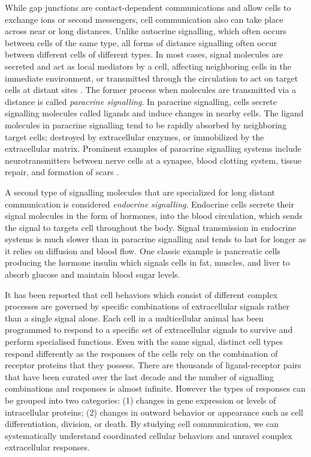 While gap junctions are contact-dependent communications and allow cells to exchange ions or second messengers, cell communication also can take place across near or long distances. Unlike autocrine signalling, which often occurs  between cells of the same type, all forms of distance signalling often occur between different cells of different types. In most cases, signal molecules are secreted and act as local mediators by a cell, affecting neighboring cells in the immediate environment, or transmitted through the circulation to act on target cells at distant sites \cite{cooper2004cell, alberts2018molecular}. The former process when molecules are transmitted via a distance is called \textit{paracrine signalling}. In paracrine signalling, cells secrete signalling molecules called ligands and induce changes in nearby cells. The ligand molecules in paracrine signalling tend to be rapidly absorbed by neighboring target cells; destroyed by extracellular enzymes, or immobilized by the extracellular matrix. Prominent examples of paracrine signalling systems include neurotransmitters between nerve cells at a synapse,  blood clotting system, tissue repair, and formation of scars
\cite{huang1998gap}. 

A second type of signalling molecules that are specialized for long distant communication is considered \textit{endocrine signalling}. Endocrine cells secrete their signal molecules in the form of hormones, into the blood circulation, which sends the signal to targets cell throughout the body. Signal transmission in endocrine systems is much slower than in paracrine signalling and tends to last for longer as it relies on diffusion and blood flow. One classic example is pancreatic cells producing the hormone insulin which signals cells in fat, muscles, and liver to absorb glucose and maintain blood sugar levels.

It has been reported that cell behaviors which consist of different complex processes are governed by specific combinations of extracellular signals rather than a single signal alone. Each cell in a multicellular animal has been programmed to respond to a specific set of extracellular signals to survive and perform specialised functions. Even with the same signal, distinct cell types respond differently as the responses of the cells rely on the combination of receptor proteins that they possess. There are thousands of ligand-receptor pairs that have been curated over the last decade \cite{salwinski2004database, orchard2012protein} and the number of signalling combinations and responses is almost infinite. However the types of responses can be grouped into two categories: (1) changes in gene expression or levels of intracellular proteins; (2) changes in outward behavior or appearance such as cell differentiation, division, or death. By studying cell communication, we can systematically understand coordinated  cellular behaviors and unravel complex extracellular responses.

